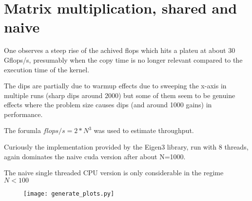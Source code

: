 \section{Matrix multiplication, shared and naive}
One observes a steep rise of the achived flops which hits a plateu at about 30 Gflops/s, presumably when the copy time is no longer relevant compared to the execution time of the kernel.

The dips are partially due to warmup effects due to sweeping the x-axis in multiple runs (sharp dips around 2000) but some of them seem to be genuine effects where the problem size causes dips (and around 1000 gains) in performance.

The forumla $flops/s = 2*N^3$ was used to estimate throughput.

Curiously the implementation provided by the Eigen3 library, run with 8 threads, again dominates the naive cuda version after about N=1000. 

The naive single threaded CPU version is only considerable in the regime $N<100$

\begin{figure}
\texttt{[image: generate\_plots.py]}
\label{block size of 8x8}
\end{figure}